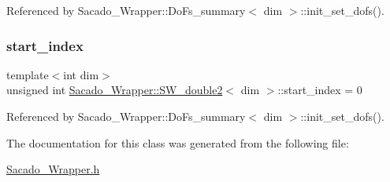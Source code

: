 Referenced by Sacado\+\_\+\+Wrapper\+::\+Do\+Fs\+\_\+summary$<$ dim $>$\+::init\+\_\+set\+\_\+dofs().

\mbox{\label{classSacado__Wrapper_1_1SW__double2_ae7327540ad1fd725ea78ffc2268b423a}} 
\subsubsection{\texorpdfstring{start\+\_\+index}{start\_index}}
{\footnotesize\ttfamily template$<$int dim$>$ \\
unsigned int \hyperlink{classSacado__Wrapper_1_1SW__double2}{Sacado\+\_\+\+Wrapper\+::\+S\+W\+\_\+double2}$<$ dim $>$\+::start\+\_\+index = 0}



Referenced by Sacado\+\_\+\+Wrapper\+::\+Do\+Fs\+\_\+summary$<$ dim $>$\+::init\+\_\+set\+\_\+dofs().



The documentation for this class was generated from the following file\+:\begin{DoxyCompactItemize}
\item 
\hyperlink{Sacado__Wrapper_8h}{Sacado\+\_\+\+Wrapper.\+h}\end{DoxyCompactItemize}
